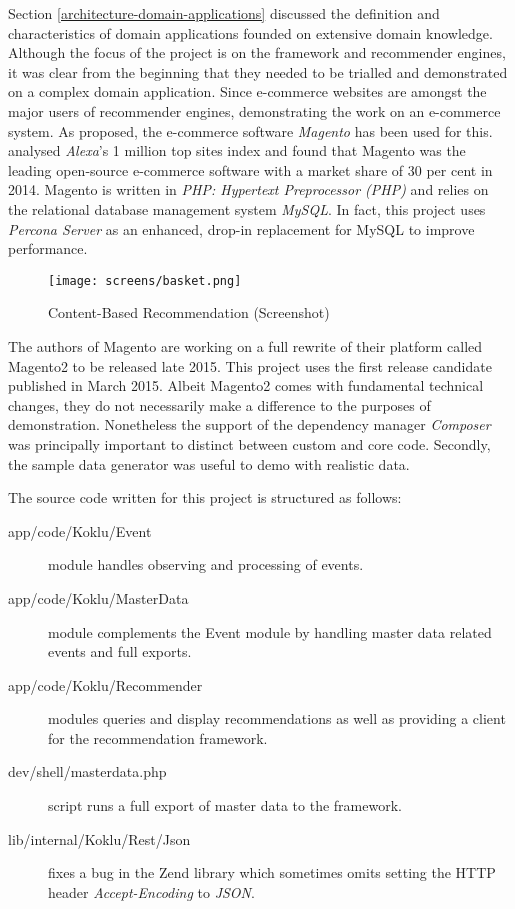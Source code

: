 Section \ref{architecture-domain-applications} discussed the definition and characteristics of domain applications founded on extensive domain knowledge. Although the focus of the project is on the framework and recommender engines, it was clear from the beginning that they needed to be trialled and demonstrated on a complex domain application. Since e-commerce websites are amongst the major users of recommender engines, demonstrating the work on an e-commerce system. As proposed, the e-commerce software \emph{Magento} has been used for this. \citet{aheadworks14} analysed \emph{Alexa}'s 1 million top sites index and found that Magento was the leading open-source e-commerce software with a market share of 30 per cent in 2014. Magento is written in \emph{PHP: Hypertext Preprocessor (PHP)} and relies on the relational database management system \emph{MySQL}. In fact, this project uses \emph{Percona Server} as an enhanced, drop-in replacement for MySQL to improve performance.

\begin{figure}[!ht]
    \texttt{[image: screens/basket.png]}
    \caption{Content-Based Recommendation (Screenshot)}
    \label{fig:implementation-magento-basket}
\end{figure}

The authors of Magento are working on a full rewrite of their platform called Magento2 to be released late 2015. This project uses the first release candidate published in March 2015. Albeit Magento2 comes with fundamental technical changes, they do not necessarily make a difference to the purposes of demonstration. Nonetheless the support of the dependency manager \emph{Composer} was principally important to distinct between custom and core code. Secondly, the sample data generator was useful to demo with realistic data.

The source code written for this project is structured as follows:

\begin{description}
    \item[app/code/Koklu/Event] module handles observing and processing of events.
    \item[app/code/Koklu/MasterData] module complements the Event module by handling master data related events and full exports.
    \item[app/code/Koklu/Recommender] modules queries and display recommendations as well as providing a client for the recommendation framework.
    \item[dev/shell/masterdata.php] script runs a full export of master data to the framework.
    \item[lib/internal/Koklu/Rest/Json] fixes a bug in the Zend library which sometimes omits setting the HTTP header \emph{Accept-Encoding} to \emph{JSON}.
\end{description}

